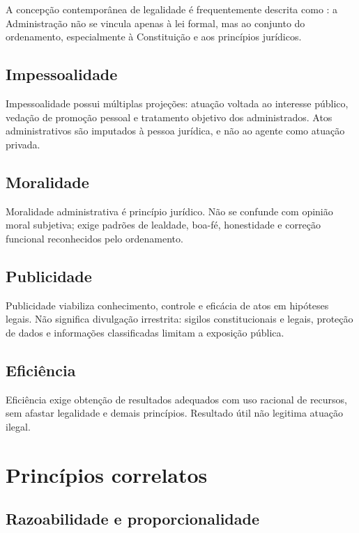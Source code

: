 A concepção contemporânea de legalidade é frequentemente descrita como : a Administração não se vincula apenas à lei formal, mas ao conjunto do ordenamento, especialmente à Constituição e aos princípios jurídicos.

\subsection{Impessoalidade}

Impessoalidade possui múltiplas projeções: atuação voltada ao interesse público, vedação de promoção pessoal e tratamento objetivo dos administrados. Atos administrativos são imputados à pessoa jurídica, e não ao agente como atuação privada.

\subsection{Moralidade}

Moralidade administrativa é princípio jurídico. Não se confunde com opinião moral subjetiva; exige padrões de lealdade, boa-fé, honestidade e correção funcional reconhecidos pelo ordenamento.

\subsection{Publicidade}

Publicidade viabiliza conhecimento, controle e eficácia de atos em hipóteses legais. Não significa divulgação irrestrita: sigilos constitucionais e legais, proteção de dados e informações classificadas limitam a exposição pública.

\subsection{Eficiência}

Eficiência exige obtenção de resultados adequados com uso racional de recursos, sem afastar legalidade e demais princípios. Resultado útil não legitima atuação ilegal.

\section{Princípios correlatos}

\subsection{Razoabilidade e proporcionalidade}

